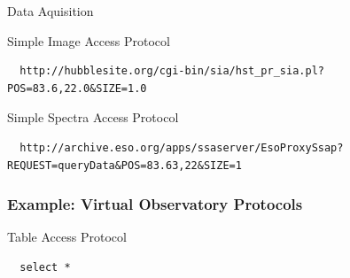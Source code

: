 \documentclass[fleqn]{beamer}
\begin{document}
\begin{section}{Data Aquisition}
\begin{frame}[containsverbatim]
Simple Image Access Protocol

\begin{lstlisting}
  http://hubblesite.org/cgi-bin/sia/hst_pr_sia.pl?POS=83.6,22.0&SIZE=1.0
\end{lstlisting}

Simple Spectra Access Protocol

\begin{lstlisting}
  http://archive.eso.org/apps/ssaserver/EsoProxySsap?REQUEST=queryData&POS=83.63,22&SIZE=1
\end{lstlisting}

\end{frame}

\begin{frame}[containsverbatim]\frametitle{Example: Virtual
    Observatory Protocols}

Table Access Protocol
\begin{lstlisting}
  select *
\end{lstlisting}

\end{frame}

\end{section}


\end{document}

